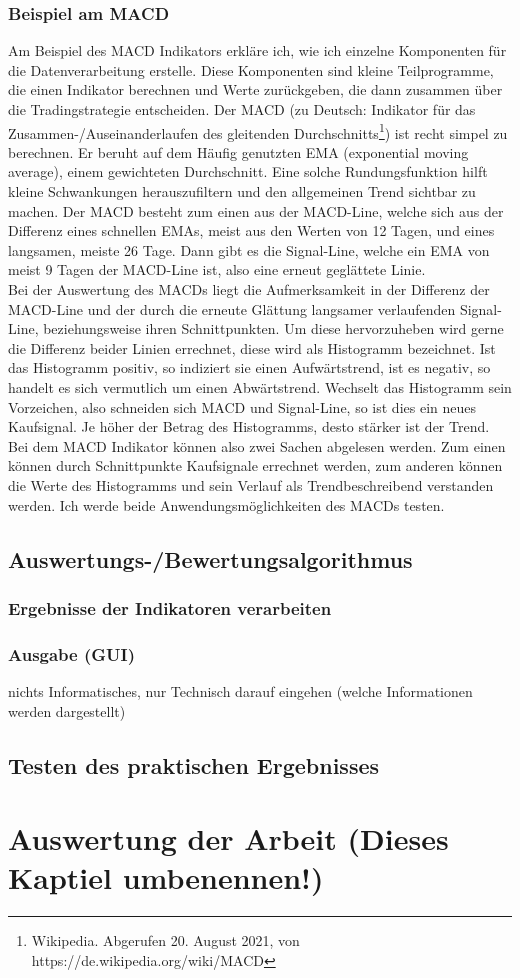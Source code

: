 \documentclass[12pt]{article}
\begin{document}
	\subsubsection{Beispiel am MACD}
		Am Beispiel des MACD Indikators erkläre ich, wie ich einzelne Komponenten für die Datenverarbeitung erstelle. Diese Komponenten sind kleine Teilprogramme, die einen Indikator berechnen und Werte zurückgeben, die dann zusammen über die Tradingstrategie entscheiden.
		Der MACD (zu Deutsch: Indikator für das Zusammen-/Auseinanderlaufen des gleitenden Durchschnitts\footnote{Wikipedia. Abgerufen 20. August 2021, von https://de.wikipedia.org/wiki/MACD}) ist recht simpel zu berechnen. Er beruht auf dem Häufig genutzten EMA (exponential moving average), einem gewichteten Durchschnitt. Eine solche Rundungsfunktion hilft kleine Schwankungen herauszufiltern und den allgemeinen Trend sichtbar zu machen. Der MACD besteht zum einen aus der MACD-Line, welche sich aus der Differenz eines schnellen EMAs, meist aus den Werten von 12 Tagen, und eines langsamen, meiste 26 Tage. Dann gibt es die Signal-Line, welche ein EMA von meist 9 Tagen der MACD-Line ist, also eine erneut geglättete Linie.\\
		Bei der Auswertung des MACDs liegt die Aufmerksamkeit in der Differenz der MACD-Line und der durch die erneute Glättung langsamer verlaufenden Signal-Line, beziehungsweise ihren Schnittpunkten. Um diese hervorzuheben wird gerne die Differenz beider Linien errechnet, diese wird als Histogramm bezeichnet. Ist das Histogramm positiv, so indiziert sie einen Aufwärtstrend, ist es negativ, so handelt es sich vermutlich um einen Abwärtstrend. Wechselt das Histogramm sein Vorzeichen, also schneiden sich MACD und Signal-Line, so ist dies ein neues Kaufsignal. Je höher der Betrag des Histogramms, desto stärker ist der Trend.\\
		Bei dem MACD Indikator können also zwei Sachen abgelesen werden. Zum einen können durch Schnittpunkte Kaufsignale errechnet werden, zum anderen können die Werte des Histogramms und sein Verlauf als Trendbeschreibend verstanden werden. Ich werde beide Anwendungsmöglichkeiten des MACDs testen.
\subsection{Auswertungs-/Bewertungsalgorithmus}
	\subsubsection{Ergebnisse der Indikatoren verarbeiten}
	\subsubsection{Ausgabe (GUI)}
		nichts Informatisches, nur Technisch darauf eingehen (welche Informationen werden dargestellt)
\subsection{Testen des praktischen Ergebnisses}
\section{Auswertung der Arbeit (Dieses Kaptiel umbenennen!)}
\end{document}
